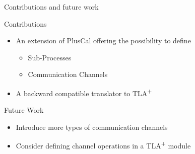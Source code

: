 \documentclass{beamer}
\newcommand{\tlaplus}{TLA\textsuperscript{+}\xspace}
\begin{document}
\begin{frame}{Contributions and future work}
\begin{block}{Contributions}
\begin{itemize}
    \item An extension of PlusCal offering the possibility to define
        \begin{itemize}
            \item Sub-Processes
            \item Communication Channels
        \end{itemize}

    \item A backward compatible translator to \tlaplus

\end{itemize}
\end{block}
\begin{block}{Future Work}
\begin{itemize}
    \item Introduce more types of communication channels
    \item Consider defining channel operations in a \tlaplus module
\end{itemize}

\end{block}

\end{frame}
\end{document}
